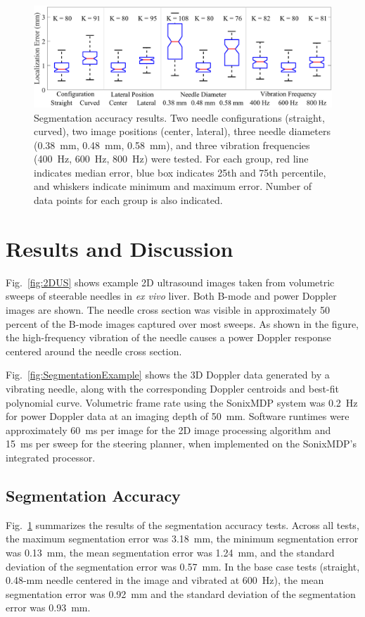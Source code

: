 \begin{figure}[!t]
\centering
\includegraphics[width=\textwidth]{Images/Chapter2/SegmentationAccuracy/SegmentationAccuracy}%
\caption[Doppler segmentation accuracy results]{Segmentation accuracy results. Two needle configurations (straight, curved), two image positions (center, lateral), three needle diameters (0.38~mm, 0.48~mm, 0.58~mm), and three vibration frequencies (400~Hz, 600~Hz, 800~Hz) were tested. For each group, red line indicates median error, blue box indicates 25th and 75th percentile, and whiskers indicate minimum and maximum error. Number of data points for each group is also indicated.}
\label{fig:SegmentationError}
\end{figure}

\section{Results and Discussion}
\label{sec:Results}
Fig.~\ref{fig:2DUS} shows example 2D ultrasound images taken from volumetric sweeps of steerable needles in \textit{ex vivo} liver. Both B-mode and power Doppler images are shown. The needle cross section was visible in approximately 50 percent of the B-mode images captured over most sweeps. As shown in the figure, the high-frequency vibration of the needle causes a power Doppler response centered around the needle cross section.

Fig.~\ref{fig:SegmentationExample} shows the 3D Doppler data generated by a vibrating needle, along with the corresponding Doppler centroids and best-fit polynomial curve. Volumetric frame rate using the SonixMDP system was 0.2~Hz for power Doppler data at an imaging depth of 50~mm. Software runtimes were approximately 60~ms per image for the 2D image processing algorithm and 15~ms per sweep for the steering planner, when implemented on the SonixMDP's integrated processor.

\subsection{Segmentation Accuracy}
Fig.~\ref{fig:SegmentationError} summarizes the results of the segmentation accuracy tests. Across all tests, the maximum segmentation error was 3.18~mm, the minimum segmentation error was 0.13~mm, the mean segmentation error was 1.24~mm, and the standard deviation of the segmentation error was 0.57~mm. In the base case tests (straight, 0.48-mm needle centered in the image and vibrated at 600~Hz), the mean segmentation error was 0.92~mm and the standard deviation of the segmentation error was 0.93~mm.

